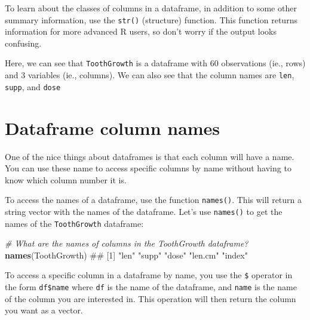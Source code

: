 \documentclass[]{book}
\newenvironment{Shaded}{\begin{snugshade}}{\end{snugshade}}
\newcommand{\KeywordTok}[1]{\textcolor[rgb]{0.13,0.29,0.53}{\textbf{{#1}}}}
\newcommand{\CommentTok}[1]{\textcolor[rgb]{0.56,0.35,0.01}{\textit{{#1}}}}
\newcommand{\NormalTok}[1]{{#1}}
\theoremstyle{definition}
\theoremstyle{definition}
\theoremstyle{remark}
\begin{document}
To learn about the classes of columns in a dataframe, in addition to
some other summary information, use the \texttt{str()} (structure)
function. This function returns information for more advanced R users,
so don't worry if the output looks confusing.

\begin{Shaded}
\end{Shaded}

Here, we can see that \texttt{ToothGrowth} is a dataframe with 60
observations (ie., rows) and 3 variables (ie., columns). We can also see
that the column names are \texttt{len}, \texttt{supp}, and \texttt{dose}

\section{Dataframe column names}\label{dataframe-column-names}

One of the nice things about dataframes is that each column will have a
name. You can use these name to access specific columns by name without
having to know which column number it is.

To access the names of a dataframe, use the function \texttt{names()}.
This will return a string vector with the names of the dataframe. Let's
use \texttt{names()} to get the names of the \texttt{ToothGrowth}
dataframe:

\begin{Shaded}
\begin{Highlighting}[]
\CommentTok{# What are the names of columns in the ToothGrowth dataframe?}
\KeywordTok{names}\NormalTok{(ToothGrowth)}
\NormalTok{## [1] "len"    "supp"   "dose"   "len.cm" "index"}
\end{Highlighting}
\end{Shaded}

To access a specific column in a dataframe by name, you use the
\texttt{\$} operator in the form \texttt{df\$name} where \texttt{df} is
the name of the dataframe, and \texttt{name} is the name of the column
you are interested in. This operation will then return the column you
want as a vector.
\end{document}
